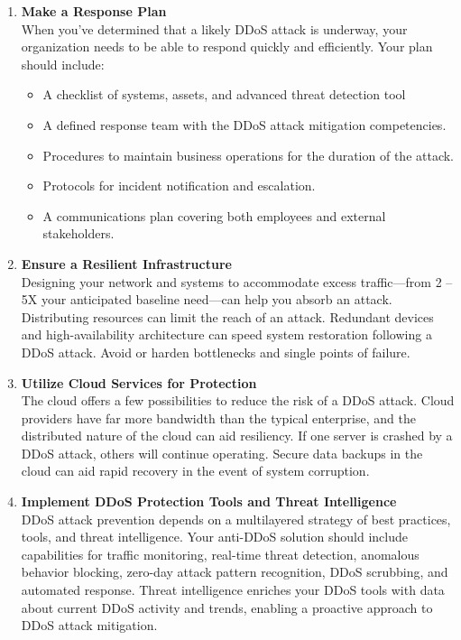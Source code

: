 \documentclass[a4paper, 12pt]{report} %
\begin{document}
\begin{table}[h!]
\begin{enumerate}
                        \item \textbf{Make a Response Plan} \\ When you’ve determined that a likely DDoS attack is underway, your organization needs to be able to respond quickly and efficiently. Your plan should include:
                        \begin{itemize}
                            \item A checklist of systems, assets, and advanced threat detection tool
                            \item A defined response team with the DDoS attack mitigation competencies.
                            \item Procedures to maintain business operations for the duration of the attack.
                            \item Protocols for incident notification and escalation.
                            \item A communications plan covering both employees and external stakeholders.
                        \end{itemize}
                        \item \textbf{Ensure a Resilient Infrastructure} \\ Designing your network and systems to accommodate excess traffic—from 2 – 5X your anticipated baseline need—can help you absorb an attack. Distributing resources can limit the reach of an attack. Redundant devices and high-availability architecture can speed system restoration following a DDoS attack. Avoid or harden bottlenecks and single points of failure.

                        \item \textbf{Utilize Cloud Services for Protection} \\ The cloud offers a few possibilities to reduce the risk of a DDoS attack. Cloud providers have far more bandwidth than the typical enterprise, and the distributed nature of the cloud can aid resiliency. If one server is crashed by a DDoS attack, others will continue operating. Secure data backups in the cloud can aid rapid recovery in the event of system corruption.

                        \item \textbf{Implement DDoS Protection Tools and Threat Intelligence} \\ DDoS attack prevention depends on a multilayered strategy of best practices, tools, and threat intelligence. Your anti-DDoS solution should include capabilities for traffic monitoring, real-time threat detection, anomalous behavior blocking, zero-day attack pattern recognition, DDoS scrubbing, and automated response. Threat intelligence enriches your DDoS tools with data about current DDoS activity and trends, enabling a proactive approach to DDoS attack mitigation.
                        


\end{enumerate}
\end{table}
\end{document}

